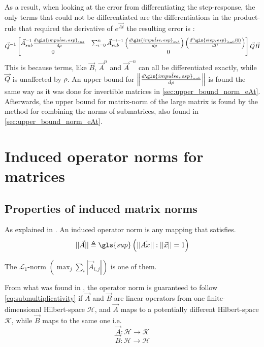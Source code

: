 As a result, when looking at the error from differentiating the step-response, the only terms that could not be differentiated are the differentiations in the product-rule that required the derivative of $e^{\Vec{A t}}$ the resulting error is :
\begin{dmath}
    \Vec{Q}^{-1}
    \begin{bmatrix}
                \Vec{A}_{sub}^{-1}\frac{ d \tilde{\gls{impulse_resp}_{sub} } }{d\rho } &
                \sum_{i=0}^n \Vec{A}_{sub}^{-i-1}\left( \frac{ d \tilde{\gls{impulse_resp}_{sub} } }{d\rho }\right) \left( \frac{d^i \gls{step_resp}_{\lambda=0}(0)}{dt^i}  \right)  \\
                0 & 0
    \end{bmatrix}\Vec{Q}\Vec{B}
    \label{eq:error_in_differentiation}
\end{dmath}
This is because terms, like $\Vec{B}$, $\Vec{A}^{n}$ and $\Vec{A}^{-n}$ can all be differentiated exactly, while $\Vec{Q}$ is unaffected by $\rho$. An upper bound for $\norm{\frac{ d \tilde{\gls{impulse_resp}_{sub} } }{d\rho }}$ is found the same way as it was done for invertible matrices in \cref{sec:upper_bound_norm_eAt}. Afterwards, the upper bound for matrix-norm of the large matrix is found by the method for combining the norms of submatrices, also found in \cref{sec:upper_bound_norm_eAt}. 


\section{Induced operator norms for matrices}
\label{sec:induced_matrix_norms}

\subsection{Properties of induced matrix norms}

As explained in \cite{Triangle_inequality_source}. An induced operator norm is any mapping that satisfies. 
\begin{equation}
    ||\Vec{A}|| \triangleq \gls{sup} \left( ||\Vec{Ax}|| : ||\Vec{x}|| =1\right)
    \label{eq:def_operator_norm}
\end{equation}

The $\mathcal{L}_1$-norm $\left(\max_j \sum_i |\Vec{A}_{i,j}|\right)$ is one of them. 

From what was found in \cite{Triangle_inequality_source}, the operator norm is guaranteed to follow \cref{eq:submultiplicativity} if $\Vec{A}$  and  $\Vec{B}$ are linear operators from one finite-dimensional Hilbert-space $\mathcal{H}$, and $\Vec{A}$ maps to a potentially different Hilbert-space $\mathcal{K}$, while $\Vec{B}$ maps to the same one  i.e. 
\begin{equation}
    \Vec{A} : \mathcal{H} \rightarrow  \mathcal{K}
\end{equation}
\begin{equation}
    \Vec{B} : \mathcal{H} \rightarrow  \mathcal{H}
\end{equation}

